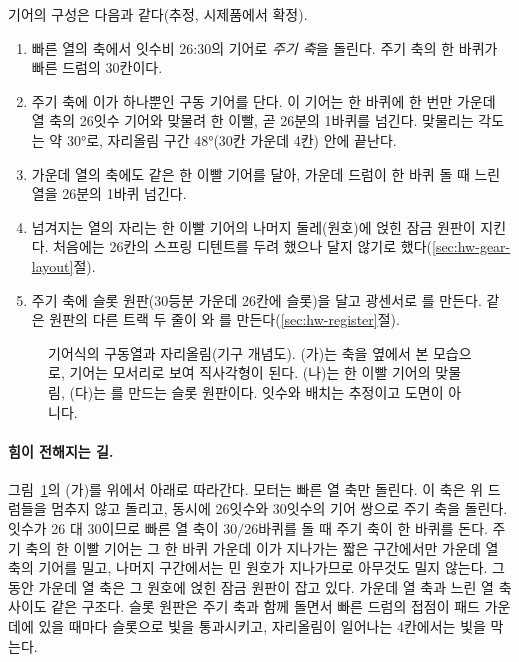 기어의 구성은 다음과 같다(추정, 시제품에서 확정).

\begin{enumerate}
\item 빠른 열의 축에서 잇수비 26:30의 기어로 \emph{주기 축}을 돌린다. 주기 축의 한 바퀴가 빠른 드럼의 30칸이다.
\item 주기 축에 이가 하나뿐인 구동 기어를 단다. 이 기어는 한 바퀴에 한 번만 가운데 열 축의 26잇수 기어와
맞물려 한 이빨, 곧 26분의 1바퀴를 넘긴다. 맞물리는 각도는 약 30°로, 자리올림 구간 48°(30칸 가운데 4칸) 안에
끝난다.
\item 가운데 열의 축에도 같은 한 이빨 기어를 달아, 가운데 드럼이 한 바퀴 돌 때 느린 열을 26분의 1바퀴 넘긴다.
\item 넘겨지는 열의 자리는 한 이빨 기어의 나머지 둘레(원호)에 얹힌 잠금 원판이 지킨다. 처음에는 26칸의 스프링
디텐트를 두려 했으나 달지 않기로 했다(\ref{sec:hw-gear-layout}절).
\item 주기 축에 슬롯 원판(30등분 가운데 26칸에 슬롯)을 달고 광센서로 를 만든다. 같은 원판의
다른 트랙 두 줄이 와 를 만든다(\ref{sec:hw-register}절).
\end{enumerate}

\begin{figure}[ht]
\centering

\caption{기어식의 구동열과 자리올림(기구 개념도). (가)는 축을 옆에서 본 모습으로, 기어는 모서리로 보여
직사각형이 된다. (나)는 한 이빨 기어의 맞물림, (다)는 를 만드는 슬롯 원판이다. 잇수와 배치는
추정이고 도면이 아니다.}
\label{fig:hw-gear-train}
\end{figure}

\paragraph{힘이 전해지는 길.} 그림~\ref{fig:hw-gear-train}의 (가)를 위에서 아래로 따라간다. 모터는 빠른 열
축만 돌린다. 이 축은 위 드럼들을 멈추지 않고 돌리고, 동시에 26잇수와 30잇수의 기어 쌍으로 주기 축을 돌린다.
잇수가 26 대 30이므로 빠른 열 축이 $30/26$바퀴를 돌 때 주기 축이 한 바퀴를 돈다. 주기 축의 한 이빨 기어는
그 한 바퀴 가운데 이가 지나가는 짧은 구간에서만 가운데 열 축의 기어를 밀고, 나머지 구간에서는 민 원호가
지나가므로 아무것도 밀지 않는다. 그동안 가운데 열 축은 그 원호에 얹힌 잠금 원판이 잡고 있다. 가운데 열 축과 느린 열 축
사이도 같은 구조다. 슬롯 원판은 주기 축과 함께 돌면서 빠른 드럼의 접점이 패드 가운데에 있을 때마다 슬롯으로
빛을 통과시키고, 자리올림이 일어나는 4칸에서는 빛을 막는다.


